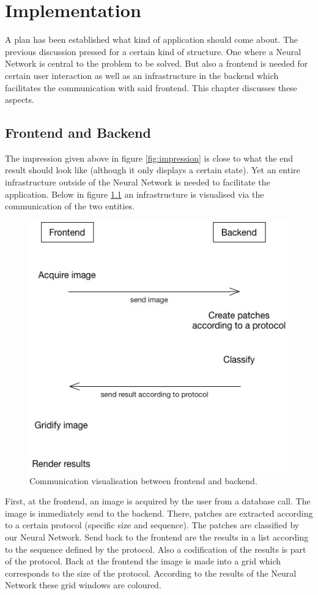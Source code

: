 \documentclass[a4paper,onecolumn]{report}
\begin{document}
\chapter{Implementation}
A plan has been established what kind of application should come about. The previous discussion pressed for a certain kind of structure. One where a Neural Network is central to the problem to be solved. But also a frontend is needed for certain user interaction as well as an infrastructure in the backend which facilitates the communication with said frontend. This chapter discusses these aspects.

\section{Frontend and Backend}
The impression given above in figure \ref{fig:impression} is close to what the end result should look like (although it only displays a certain state). Yet an entire infrastructure outside of the Neural Network is needed to facilitate the application. Below in figure \ref{fig:communication} an infrastructure is visualised via the communication of the two entities.

\begin{figure}[h!]
    \centering
    \includegraphics[scale=0.5]{./images/communication.jpg}
    \caption{Communication visualisation between frontend and backend.}
	\label{fig:communication}
\end{figure}
\noindent
First, at the frontend, an image is acquired by the user from a database call. The image is immediately send to the backend. There, patches are extracted according to a certain protocol (specific size and sequence). The patches are classified by our Neural Network. Send back to the frontend are the results in a list according to the sequence defined by the protocol. Also a codification of the results is part of the protocol. Back at the frontend the image is made into a grid which corresponds to the size of the protocol. According to the results of the Neural Network these grid windows are coloured.
\end{document}
